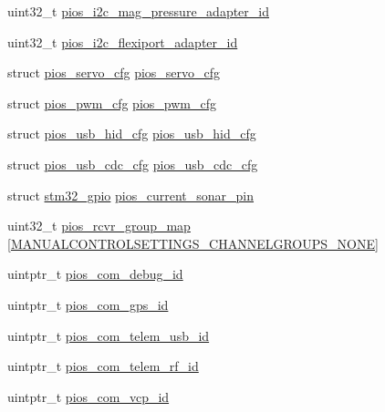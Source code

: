 \begin{DoxyCompactItemize}
\item 
uint32\-\_\-t \hyperlink{group___revo_mini_ga0bc1cddc7bfac02e5a765f1ff09ad29f}{pios\-\_\-i2c\-\_\-mag\-\_\-pressure\-\_\-adapter\-\_\-id}
\item 
uint32\-\_\-t \hyperlink{group___revo_mini_ga20b68de0b754d943d653d816aad86148}{pios\-\_\-i2c\-\_\-flexiport\-\_\-adapter\-\_\-id}
\item 
struct \hyperlink{structpios__servo__cfg}{pios\-\_\-servo\-\_\-cfg} \hyperlink{group___revo_mini_ga57a87ef16d7949a9cc3589efc8d88a28}{pios\-\_\-servo\-\_\-cfg}
\item 
struct \hyperlink{structpios__pwm__cfg}{pios\-\_\-pwm\-\_\-cfg} \hyperlink{group___revo_mini_ga7587f8e174df90bef8cec1edfa9e14c1}{pios\-\_\-pwm\-\_\-cfg}
\item 
struct \hyperlink{structpios__usb__hid__cfg}{pios\-\_\-usb\-\_\-hid\-\_\-cfg} \hyperlink{group___revo_mini_ga3665f6d3a2cccc431b55b9432291e94c}{pios\-\_\-usb\-\_\-hid\-\_\-cfg}
\item 
struct \hyperlink{structpios__usb__cdc__cfg}{pios\-\_\-usb\-\_\-cdc\-\_\-cfg} \hyperlink{group___revo_mini_ga05cc3e449d417c7f9097d2659e6f5ca3}{pios\-\_\-usb\-\_\-cdc\-\_\-cfg}
\item 
struct \hyperlink{structstm32__gpio}{stm32\-\_\-gpio} \hyperlink{group___revo_mini_ga606e58ec5cbb14b404f825ca313fb71e}{pios\-\_\-current\-\_\-sonar\-\_\-pin}
\item 
uint32\-\_\-t \hyperlink{group___revo_mini_ga6c6cfc16eb738e47c123298e062297e2}{pios\-\_\-rcvr\-\_\-group\-\_\-map} \mbox{[}\hyperlink{group___manual_control_settings_gga94e1fe696fef2f85cbdb4a2e479c7ed2af9104b4e2c50328b0912db1e10fc3074}{\-M\-A\-N\-U\-A\-L\-C\-O\-N\-T\-R\-O\-L\-S\-E\-T\-T\-I\-N\-G\-S\-\_\-\-C\-H\-A\-N\-N\-E\-L\-G\-R\-O\-U\-P\-S\-\_\-\-N\-O\-N\-E}\mbox{]}
\item 
uintptr\-\_\-t \hyperlink{group___revo_mini_ga14dc9e3d330b80a37a9699c2112358e0}{pios\-\_\-com\-\_\-debug\-\_\-id}
\item 
uintptr\-\_\-t \hyperlink{group___revo_mini_ga05dca72c42c6c2b33fa62b8ee0fcb2ea}{pios\-\_\-com\-\_\-gps\-\_\-id}
\item 
uintptr\-\_\-t \hyperlink{group___revo_mini_ga513cc36d72b76de2fcb75ff233a79a4a}{pios\-\_\-com\-\_\-telem\-\_\-usb\-\_\-id}
\item 
uintptr\-\_\-t \hyperlink{group___revo_mini_gae48e848f715b08971e23528feee79339}{pios\-\_\-com\-\_\-telem\-\_\-rf\-\_\-id}
\item 
uintptr\-\_\-t \hyperlink{group___revo_mini_gaaeb3e0d65ed5c6e7b921c54e1ad905db}{pios\-\_\-com\-\_\-vcp\-\_\-id}

\end{DoxyCompactItemize}
